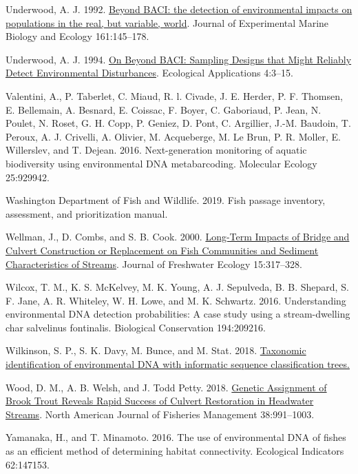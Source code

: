 \documentclass[
]{article}
\newlength{\cslhangindent}
\newlength{\cslentryspacingunit} %
\newenvironment{CSLReferences}[2] %
 {%
  \setlength{\parindent}{0pt}
  \ifodd #1
  \let\oldpar\par
  \def\par{\hangindent=\cslhangindent\oldpar}
  \fi
  \setlength{\parskip}{#2\cslentryspacingunit}
 }%
 {}
\begin{document}
\begin{CSLReferences}{1}{0}
\leavevmode{}%
Underwood, A. J. 1992.
\href{https://doi.org/10.1016/0022-0981(92)90094-Q}{Beyond BACI: the
detection of environmental impacts on populations in the real, but
variable, world}. Journal of Experimental Marine Biology and Ecology
161:145--178.

\leavevmode{}%
Underwood, A. J. 1994. \href{https://doi.org/10.2307/1942110}{On Beyond
BACI: Sampling Designs that Might Reliably Detect Environmental
Disturbances}. Ecological Applications 4:3--15.

\leavevmode{}%
Valentini, A., P. Taberlet, C. Miaud, R. l. Civade, J. E. Herder, P. F.
Thomsen, E. Bellemain, A. Besnard, E. Coissac, F. Boyer, C. Gaboriaud,
P. Jean, N. Poulet, N. Roset, G. H. Copp, P. Geniez, D. Pont, C.
Argillier, J.-M. Baudoin, T. Peroux, A. J. Crivelli, A. Olivier, M.
Acqueberge, M. Le Brun, P. R. Moller, E. Willerslev, and T. Dejean.
2016. Next-generation monitoring of aquatic biodiversity using
environmental DNA metabarcoding. Molecular Ecology 25:929942.

\leavevmode{}%
Washington Department of Fish and Wildlife. 2019. Fish passage
inventory, assessment, and prioritization manual.

\leavevmode{}%
Wellman, J., D. Combs, and S. B. Cook. 2000.
\href{https://www.tandfonline.com/doi/epdf/10.1080/02705060.2000.9663750?needAccess=true\&role=button}{Long-Term
Impacts of Bridge and Culvert Construction or Replacement on Fish
Communities and Sediment Characteristics of Streams}. Journal of
Freshwater Ecology 15:317--328.

\leavevmode{}%
Wilcox, T. M., K. S. McKelvey, M. K. Young, A. J. Sepulveda, B. B.
Shepard, S. F. Jane, A. R. Whiteley, W. H. Lowe, and M. K. Schwartz.
2016. Understanding environmental DNA detection probabilities: A case
study using a stream-dwelling char salvelinus fontinalis. Biological
Conservation 194:209216.

\leavevmode{}%
Wilkinson, S. P., S. K. Davy, M. Bunce, and M. Stat. 2018.
\href{https://doi.org/10.7287/peerj.preprints.26812v1}{Taxonomic
identification of environmental DNA with informatic sequence
classification trees.}

\leavevmode{}%
Wood, D. M., A. B. Welsh, and J. Todd Petty. 2018.
\href{https://doi.org/10.1002/nafm.10185}{Genetic Assignment of Brook
Trout Reveals Rapid Success of Culvert Restoration in Headwater
Streams}. North American Journal of Fisheries Management 38:991--1003.

\leavevmode{}%
Yamanaka, H., and T. Minamoto. 2016. The use of environmental DNA of
fishes as an efficient method of determining habitat connectivity.
Ecological Indicators 62:147153.

\end{CSLReferences}
\end{document}
